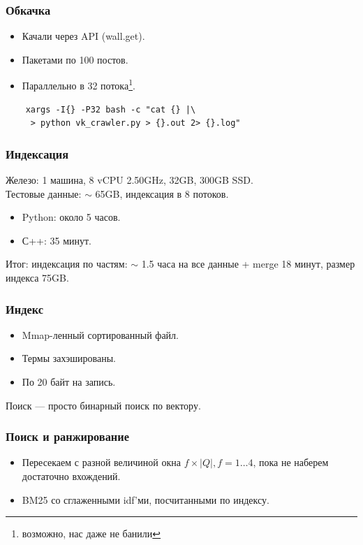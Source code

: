 \documentclass{beamer}
\begin{document}
\begin{frame}[fragile]
  \frametitle{Обкачка}
    \begin{itemize}
      \item Качали через API (wall.get).
      \item Пакетами по 100 постов.
      \item Параллельно в 32 потока\footnote{возможно, нас даже не банили}.
    \end{itemize}

  \begin{verbatim}
    xargs -I{} -P32 bash -c "cat {} |\
     > python vk_crawler.py > {}.out 2> {}.log"
  \end{verbatim}

\end{frame}

\begin{frame}
  \frametitle{Индексация}
    Железо: 1 машина, 8 vCPU 2.50GHz, 32GB, 300GB SSD. \\
    Тестовые данные: $\sim$ 65GB, индексация в 8 потоков.
    \begin{itemize}
      \item Python: около 5 часов.
      \item С++: 35 минут.
    \end{itemize}
    Итог: индексация по частям: $\sim$ 1.5 часа на все данные + merge 18 минут,
      размер индекса 75GB.
\end{frame}

\begin{frame}
  \frametitle{Индекс}
    \begin{itemize}
      \item Mmap-ленный сортированный файл.
      \item Термы захэшированы.
      \item По 20 байт на запись.
    \end{itemize}

    Поиск --- просто бинарный поиск по вектору.
\end{frame}

\begin{frame}
  \frametitle{Поиск и ранжирование}
  \begin{itemize}
    \item Пересекаем с разной величиной окна $f\times |Q|, f = 1\dots4$,
      пока не наберем достаточно вхождений.
    \item BM25 со сглаженными idf'ми, посчитанными по индексу.
  \end{itemize}
\end{frame}
\end{document}
